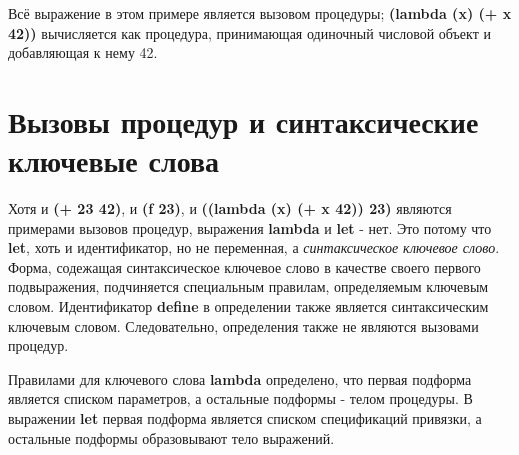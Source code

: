 Всё выражение в этом примере является вызовом процедуры; {\cf\bfseries (lambda (x) (+ x 42))}
вычисляется как процедура, принимающая одиночный числовой объект и добавляющая к нему 42.

\section{Вызовы процедур и синтаксические ключевые слова}

Хотя и {\cf\bfseries (+ 23 42)}, и {\cf\bfseries (f 23)}, и {\cf\bfseries ((lambda (x) (+ x 42))
  23)} являются примерами вызовов процедур, выражения {\cf\bfseries lambda} и {\cf\bfseries let} -
нет. Это потому что {\cf\bfseries let}, хоть и идентификатор, но
не переменная, а \textit{синтаксическое ключевое слово}. Форма, содежащая синтаксическое ключевое слово в качестве своего первого подвыражения,
подчиняется специальным правилам, определяемым ключевым словом. Идентификатор {\cf\bfseries
  define} в определении также является синтаксическим ключевым словом. Следовательно,
определения также не являются вызовами процедур.

Правилами для ключевого слова {\cf\bfseries lambda} определено, что первая подформа является
списком параметров, а остальные подформы - телом процедуры. В выражении {\cf\bfseries let}
первая подформа является списком спецификаций привязки, а остальные подформы образовывают тело
выражений.

